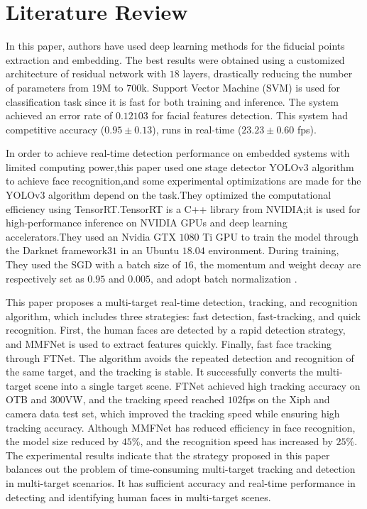     \chapter{Literature Review}
In this paper, authors  have used deep learning methods for the fiducial points extraction and embedding. The best results were obtained using a customized architecture of residual network with $18$ layers, drastically reducing the number of parameters from $19$M to $700$k. Support Vector Machine (SVM) is used for classification task since it is fast for both training and inference. The system achieved an error rate of $0.12103$ for facial features detection. This system had competitive accuracy ($0.95\pm 0.13$), runs in real-time ($23.23 \pm 0.60$ fps)\cite{DeepLearningBasedFacialRecogition}.

In order to achieve real-time detection performance on embedded systems with limited computing power,this paper used one stage detector YOLOv$3$ algorithm to achieve face recognition,and some experimental optimizations are made for the YOLOv$3$ algorithm depend on the task.They optimized the computational efficiency using TensorRT.TensorRT is a C++ library from NVIDIA;it is used for high-performance inference on NVIDIA GPUs and deep learning accelerators.They used an Nvidia GTX $1080$ Ti GPU to train the model through the Darknet framework$31$ in an Ubuntu $18.04$ environment. During training, They used the SGD with a batch size of $16$, the momentum and weight decay are respectively set as $0.95$ and $0.005$, and adopt batch normalization \cite{UsingCNNandPID}.

This paper proposes a multi-target real-time detection, tracking, and recognition algorithm,
which includes three strategies: fast detection, fast-tracking, and quick recognition. First, the
human faces are detected by a rapid detection strategy, and MMFNet is used to extract features
quickly. Finally, fast face tracking through FTNet. The algorithm avoids the repeated detection and recognition of the same target, and the tracking is stable. It successfully converts the multi-target scene into a single target scene. FTNet achieved high tracking accuracy on OTB and 300VW,
 and the tracking speed reached $102$fps on the Xiph and camera data test set, which improved the tracking speed while ensuring high tracking accuracy. Although MMFNet has reduced efficiency in face recognition, the model size reduced by $45$\%, and the recognition speed has increased by $25$\%. The experimental results indicate that the strategy proposed in this paper balances out the problem of time-consuming multi-target tracking and detection in multi-target scenarios. It has sufficient accuracy and real-time performance in detecting and
identifying human faces in multi-target scenes\cite{LiWangFangZeng2020}.

